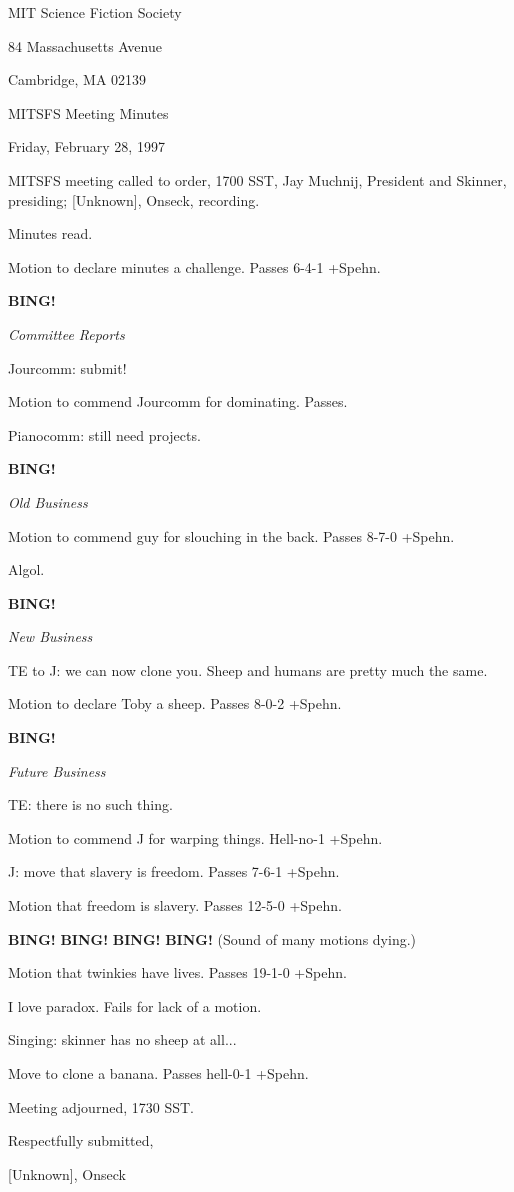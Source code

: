 \documentclass[12pt]{article}
\newcommand{\bing}{{\bf BING!} }
\newcommand{\goto}[1]{\bing \vskip 12pt \centerline{{\em{#1}}}}
\begin{document}
\begin{center}

MIT Science Fiction Society 

84 Massachusetts Avenue

Cambridge, MA 02139

\vspace{12pt}

MITSFS Meeting Minutes 

Friday, February 28, 1997

\end{center}
 
\vspace{18pt}

\setlength{\parskip}{6pt}

\noindent
MITSFS meeting called to order, 1700 SST,
Jay Muchnij, President and Skinner, presiding; [Unknown], Onseck, recording.

Minutes read.

Motion to declare minutes a challenge. Passes 6-4-1 +Spehn.

\goto{Committee Reports}

Jourcomm: submit!

Motion to commend Jourcomm for dominating. Passes.

Pianocomm: still need projects.

\goto{Old Business}

Motion to commend guy for slouching in the back. Passes 8-7-0 +Spehn.

Algol.

\goto{New Business}

TE to J: we can now clone you. Sheep and humans are pretty much the same.

Motion to declare Toby a sheep. Passes 8-0-2 +Spehn.

\goto{Future Business}

TE: there is no such thing.

Motion to commend J for warping things. Hell-no-1 +Spehn.

J: move that slavery is freedom. Passes 7-6-1 +Spehn.

Motion that freedom is slavery. Passes 12-5-0 +Spehn.

\bing \bing \bing \bing (Sound of many motions dying.)

Motion that twinkies have lives. Passes 19-1-0 +Spehn.

I love paradox. Fails for lack of a motion.

Singing: skinner has no sheep at all...

Move to clone a banana. Passes hell-0-1 +Spehn.

\vspace{12pt}

\noindent
Meeting adjourned, 1730 SST.

\vspace{18pt}

\centerline{Respectfully submitted,}
\centerline{[Unknown], Onseck}
\end{document}
